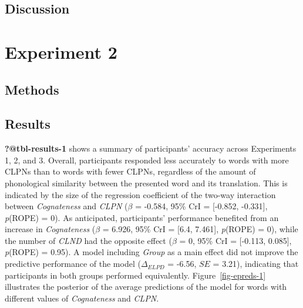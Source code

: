 \documentclass[
]{article}
\begin{document}
\subsection{Discussion}\label{discussion}

\section{Experiment 2}\label{experiment-2}

\subsection{Methods}\label{methods-1}

\subsection{Results}\label{results-1}

\textbf{?@tbl-results-1} shows a summary of participants' accuracy
across Experiments 1, 2, and 3. Overall, participants responded less
accurately to words with more CLPNs than to words with fewer CLPNs,
regardless of the amount of phonological similarity between the
presented word and its translation. This is indicated by the size of the
regression coefficient of the two-way interaction between
\emph{Cognateness} and \emph{CLPN} (\(\beta\) = -0.584, 95\% CrI =
{[}-0.852, -0.331{]}, \emph{p}(ROPE) = 0). As anticipated, participants'
performance benefited from an increase in \emph{Cognateness} (\(\beta\)
= 6.926, 95\% CrI = {[}6.4, 7.461{]}, \emph{p}(ROPE) = 0), while the
number of \emph{CLND} had the opposite effect (\(\beta\) = 0, 95\% CrI =
{[}-0.113, 0.085{]}, \emph{p}(ROPE) = 0.95). A model including
\emph{Group} as a main effect did not improve the predictive performance
of the model (\(\Delta_{ELPD}\) = -6.56, \(SE\) = 3.21), indicating that
participants in both groups performed equivalently.
Figure~\ref{fig-epreds-1} illustrates the posterior of the average
predictions of the model for words with different values of
\emph{Cognateness} and \emph{CLPN}.

\begin{figure}


\caption{\label{fig-epreds-2}}

\end{figure}%
\end{document}

